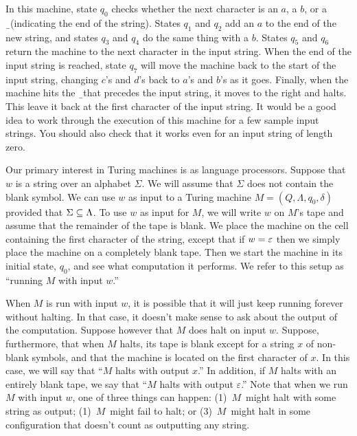 \medbreak
\centerline{}
\medbreak

In this machine, state $q_0$ checks whether the next character
is an $a$, a $b$, or a \b\ (indicating the end of the string).
States $q_1$ and $q_2$ add an $a$ to the end of the new string,
and states $q_3$ and $q_4$ do the same thing with a $b$.
States $q_5$ and $q_6$ return the machine to the next character
in the input string.  When the end of the input string is reached,
state $q_7$ will move the machine back to the start of the input
string, changing $c$'s and $d$'s back to $a$'s and $b$'s as it goes.
Finally, when the machine hits the \b\ that precedes the input string,
it moves to the right and halts.  This leave it back at the first
character of the input string.  It would be a good idea to work through
the execution of this machine for a few sample input strings.
You should also check that it works even for an input string of
length zero.

\medbreak

Our primary interest in Turing machines is as language processors.
Suppose that $w$ is a string over an alphabet $\Sigma$.  We will assume
that $\Sigma$ does not contain the blank symbol.  We can use $w$ as
input to a Turing machine $M=(Q,\Lambda,q_0,\delta)$ provided that
$\Sigma\subseteq\Lambda$.  To use $w$ as input for $M$, we will write
$w$ on $M$'s tape and assume that the remainder of the tape is blank.
We place the machine on the cell containing the first character
of the string, except that if $w=\varepsilon$ then we simply place the
machine on a completely blank tape.   Then we start the machine in its 
initial state, $q_0$, and see what computation it performs.
We refer to this setup as ``running $M$ with input $w$.''

When $M$ is run with input $w$, it is possible that it will just keep
running forever without halting.  In that case, it doesn't make
sense to ask about the output of the computation.  Suppose however
that $M$ does halt on input $w$.  Suppose, furthermore, that when
$M$ halts, its tape is blank except for a string $x$ of non-blank
symbols, and that the machine is located on the first character
of $x$.  In this case, we will say that ``$M$ halts with output $x$.''
In addition, if $M$ halts with an entirely blank tape, we say that
``$M$ halts with output $\varepsilon$.''
Note that when we run $M$ with input $w$, one of three things can happen:
(1)~$M$~might halt with some string as output; (1)~$M$~might fail to halt; 
or (3)~$M$~might halt in some configuration that doesn't
count as outputting any string.

